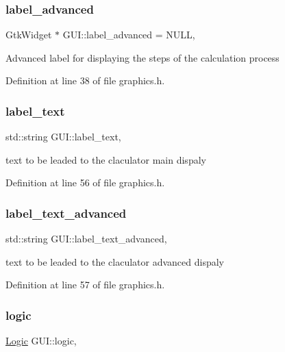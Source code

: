 \subsubsection{\texorpdfstring{label\_advanced}{label\_advanced}}
{\footnotesize\ttfamily Gtk\+Widget $\ast$ G\+U\+I\+::label\+\_\+advanced = N\+U\+LL\hspace{0.3cm}{\ttfamily [static]}, {\ttfamily [protected]}}

Advanced label for displaying the steps of the calculation process 

Definition at line 38 of file graphics.\+h.

\mbox{\label{class_g_u_i_a999eed2f94439640a5b3e7381d0486fb}} 
\subsubsection{\texorpdfstring{label\_text}{label\_text}}
{\footnotesize\ttfamily std\+::string G\+U\+I\+::label\+\_\+text\hspace{0.3cm}{\ttfamily [static]}, {\ttfamily [protected]}}

text to be leaded to the claculator main dispaly 

Definition at line 56 of file graphics.\+h.

\mbox{\label{class_g_u_i_a517b263240970d2867605ea2c7f5fcde}} 
\subsubsection{\texorpdfstring{label\_text\_advanced}{label\_text\_advanced}}
{\footnotesize\ttfamily std\+::string G\+U\+I\+::label\+\_\+text\+\_\+advanced\hspace{0.3cm}{\ttfamily [static]}, {\ttfamily [protected]}}

text to be leaded to the claculator advanced dispaly 

Definition at line 57 of file graphics.\+h.

\mbox{\label{class_g_u_i_ae76cddcd30061092ac9c1bd4720d3ea2}} 
\subsubsection{\texorpdfstring{logic}{logic}}
{\footnotesize\ttfamily \mbox{\hyperlink{class_logic}{Logic}} G\+U\+I\+::logic\hspace{0.3cm}{\ttfamily [static]}, {\ttfamily [protected]}}

